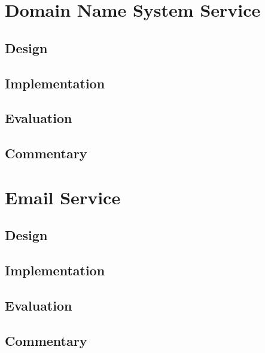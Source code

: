 \section{Domain Name System Service}

\subsection{Design}

\subsection{Implementation}

\subsection{Evaluation}

\subsection{Commentary}


\section{Email Service}

\subsection{Design}

\subsection{Implementation}

\subsection{Evaluation}

\subsection{Commentary}
